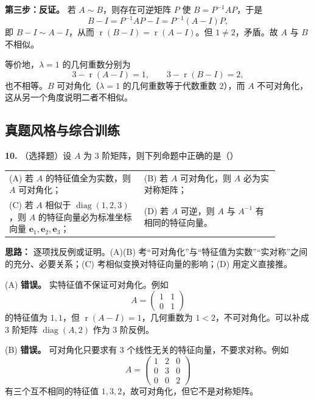 \textbf{第三步：反证。} 若 \(A\sim B\)，则存在可逆矩阵 \(P\) 使 \(B=P^{-1}AP\)，于是
\[
B-I=P^{-1}AP-I=P^{-1}(A-I)P,
\]
即 \(B-I\sim A-I\)，从而 \(\operatorname{r}(B-I)=\operatorname{r}(A-I)\)。但 \(1\neq2\)，矛盾。故 \(A\) 与 \(B\) 不相似。

等价地，\(\lambda=1\) 的几何重数分别为
\[
3-\operatorname{r}(A-I)=1,\qquad 3-\operatorname{r}(B-I)=2,
\]
也不相等。\(B\) 可对角化（\(\lambda=1\) 的几何重数等于代数重数 \(2\)），而 \(A\) 不可对角化，这从另一个角度说明二者不相似。

\else \answerarea[10] \fi%

\subsection{真题风格与综合训练}

\textbf{10.} （选择题）设 \(A\) 为 \(3\) 阶矩阵，则下列命题中正确的是（\quad）
\begin{center}
\begin{tabular}{p{0.44\linewidth}p{0.44\linewidth}}
(A) 若 \(A\) 的特征值全为实数，则 \(A\) 可对角化； &
(B) 若 \(A\) 可对角化，则 \(A\) 必为实对称矩阵； \\[6pt]
(C) 若 \(A\) 相似于 \(\operatorname{diag}(1,2,3)\)，则 \(A\) 的特征向量必为标准坐标向量 \(\mathbf{e}_1,\mathbf{e}_2,\mathbf{e}_3\)； &
(D) 若 \(A\) 可逆，则 \(A\) 与 \(A^{-1}\) 有相同的特征向量。
\end{tabular}
\end{center}

\ifshowsolutions%
\textbf{思路：} 逐项找反例或证明。(A)(B) 考“可对角化”与“特征值为实数”“实对称”之间的充分、必要关系；(C) 考相似变换对特征向量的影响；(D) 用定义直接推。

(A) \textbf{错误。} 实特征值不保证可对角化。例如
\[
A=\begin{pmatrix}1&1\\0&1\end{pmatrix}
\]
的特征值为 \(1,1\)，但 \(\operatorname{r}(A-I)=1\)，几何重数为 \(1<2\)，不可对角化。可以补成 \(3\) 阶矩阵 \(\operatorname{diag}(A,2)\) 作为 \(3\) 阶反例。

(B) \textbf{错误。} 可对角化只要求有 \(3\) 个线性无关的特征向量，不要求对称。例如
\[
A=\begin{pmatrix}1&2&0\\0&3&0\\0&0&2\end{pmatrix}
\]
有三个互不相同的特征值 \(1,3,2\)，故可对角化，但它不是对称矩阵。

